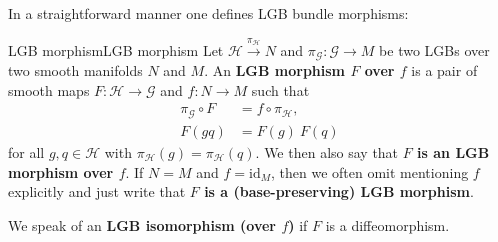 \documentclass[reqno,a4paper,oneside]{amsart}
\theoremstyle{plain}
\theoremstyle{remark}
\theoremstyle{definition}
\begin{document}
In a straightforward manner one defines LGB bundle morphisms:

\begin{definitions}{LGB morphism}{LGB morphism}
Let $\mathcal{H} \stackrel{\pi_{\mathcal{H}}}{\to} N$ and $\pi_{\mathcal{G}} \colon \mathcal{G} \to M$ be two LGBs over two smooth manifolds $N$ and $M$. An \textbf{LGB morphism $F$ over $f$} is a pair of smooth maps $F: \mathcal{H} \to \mathcal{G}$ and $f: N \to M$ such that
\begin{align*}
\pi_{\mathcal{G}} \circ F &= f \circ \pi_{\mathcal{H}},\\
F(gq) &= F(g) ~ F(q)
\end{align*}
for all $g, q \in \mathcal{H}$ with $\pi_{\mathcal{H}}(g) = \pi_{\mathcal{H}}(q)$. We then also say that \textbf{$F$ is an LGB morphism over $f$}. If $N = M$ and $f = \mathrm{id}_M$, then we often omit mentioning $f$ explicitly and just write that \textbf{$F$ is a (base-preserving) LGB morphism}.

We speak of an \textbf{LGB isomorphism (over $f$)} if $F$ is a diffeomorphism.
\end{definitions}
\end{document}
